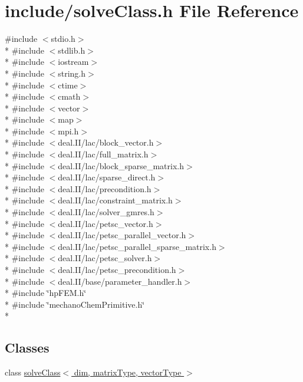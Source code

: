 \section{include/solve\-Class.h File Reference}
\label{solve_class_8h}
{\ttfamily \#include $<$stdio.\-h$>$}\\*
{\ttfamily \#include $<$stdlib.\-h$>$}\\*
{\ttfamily \#include $<$iostream$>$}\\*
{\ttfamily \#include $<$string.\-h$>$}\\*
{\ttfamily \#include $<$ctime$>$}\\*
{\ttfamily \#include $<$cmath$>$}\\*
{\ttfamily \#include $<$vector$>$}\\*
{\ttfamily \#include $<$map$>$}\\*
{\ttfamily \#include $<$mpi.\-h$>$}\\*
{\ttfamily \#include $<$deal.\-I\-I/lac/block\-\_\-vector.\-h$>$}\\*
{\ttfamily \#include $<$deal.\-I\-I/lac/full\-\_\-matrix.\-h$>$}\\*
{\ttfamily \#include $<$deal.\-I\-I/lac/block\-\_\-sparse\-\_\-matrix.\-h$>$}\\*
{\ttfamily \#include $<$deal.\-I\-I/lac/sparse\-\_\-direct.\-h$>$}\\*
{\ttfamily \#include $<$deal.\-I\-I/lac/precondition.\-h$>$}\\*
{\ttfamily \#include $<$deal.\-I\-I/lac/constraint\-\_\-matrix.\-h$>$}\\*
{\ttfamily \#include $<$deal.\-I\-I/lac/solver\-\_\-gmres.\-h$>$}\\*
{\ttfamily \#include $<$deal.\-I\-I/lac/petsc\-\_\-vector.\-h$>$}\\*
{\ttfamily \#include $<$deal.\-I\-I/lac/petsc\-\_\-parallel\-\_\-vector.\-h$>$}\\*
{\ttfamily \#include $<$deal.\-I\-I/lac/petsc\-\_\-parallel\-\_\-sparse\-\_\-matrix.\-h$>$}\\*
{\ttfamily \#include $<$deal.\-I\-I/lac/petsc\-\_\-solver.\-h$>$}\\*
{\ttfamily \#include $<$deal.\-I\-I/lac/petsc\-\_\-precondition.\-h$>$}\\*
{\ttfamily \#include $<$deal.\-I\-I/base/parameter\-\_\-handler.\-h$>$}\\*
{\ttfamily \#include \char`\"{}hp\-F\-E\-M.\-h\char`\"{}}\\*
{\ttfamily \#include \char`\"{}mechano\-Chem\-Primitive.\-h\char`\"{}}\\*
\subsection*{Classes}
\begin{DoxyCompactItemize}
\item 
class \hyperlink{classsolve_class}{solve\-Class$<$ dim, matrix\-Type, vector\-Type $>$}
\end{DoxyCompactItemize}
